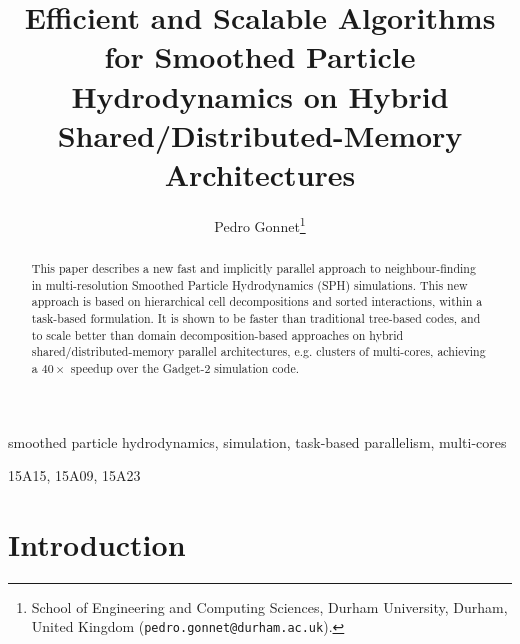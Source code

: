 \documentclass[final]{siamltex}
\date{}
\title{Efficient and Scalable Algorithms for Smoothed Particle Hydrodynamics on
    Hybrid Shared/Distributed-Memory Architectures}
\author{Pedro Gonnet\thanks{School of Engineering and Computing Sciences,
    Durham University, Durham, United Kingdom ({\tt pedro.gonnet@durham.ac.uk}).}}
\begin{document}
\lstset{%
    language=C,
    basicstyle=\small\tt,
    numbers=left,
    numberstyle=\tiny
    }


\maketitle


\begin{abstract}
This paper describes a new fast and implicitly parallel
approach to neighbour-finding in multi-resolution
Smoothed Particle Hydrodynamics (SPH) simulations.
This new approach is based on hierarchical cell decompositions and
sorted interactions, within a task-based formulation.
It is shown to be faster than traditional tree-based
codes, and to scale better than domain decomposition-based approaches on
hybrid shared/distributed-memory parallel architectures, e.g. clusters
of multi-cores, achieving a $40\times$ speedup over the Gadget-2
simulation code.
\end{abstract}


\begin{keywords} 
smoothed particle hydrodynamics,
simulation,
task-based parallelism,
multi-cores
\end{keywords}

\begin{AMS}
15A15, 15A09, 15A23
\end{AMS}

\pagestyle{myheadings}
\thispagestyle{plain}


\section{Introduction}
\end{document}
